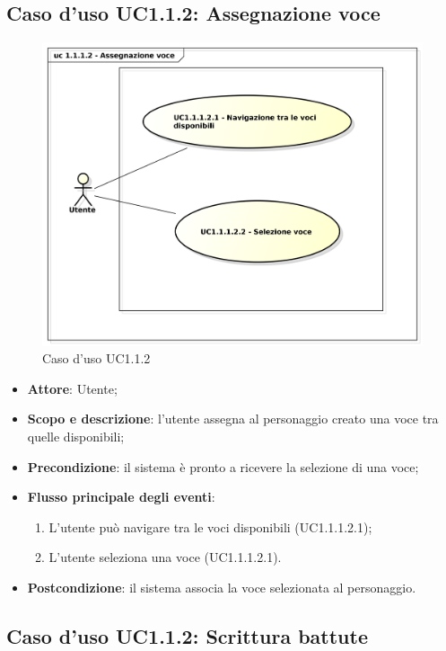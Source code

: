 \subsection{Caso d'uso UC1.1.2: Assegnazione voce}

\begin{figure}[htbp]
\centering
\includegraphics[scale=0.5]{UseCase_17_03_2016/immagini/uc_1_1_1_2_assegnazione_voce.png}
\captionsetup{labelfont=bf}
\caption{Caso d'uso UC1.1.2}
\end{figure}

\begin{itemize}
\item \textbf{Attore}: Utente;
\item \textbf{Scopo e descrizione}: l'utente assegna al personaggio creato una voce tra quelle disponibili; 
\item \textbf{Precondizione}: il sistema è pronto a ricevere la selezione di una voce;
\item \textbf{Flusso principale degli eventi}:
\begin{enumerate}
\item L'utente può navigare tra le voci disponibili (UC1.1.1.2.1);
\item L'utente seleziona una voce (UC1.1.1.2.1).
\end{enumerate}
\item \textbf{Postcondizione}: il sistema associa la voce selezionata al personaggio.
\end{itemize}

\subsection{Caso d'uso UC1.1.2: Scrittura battute}

